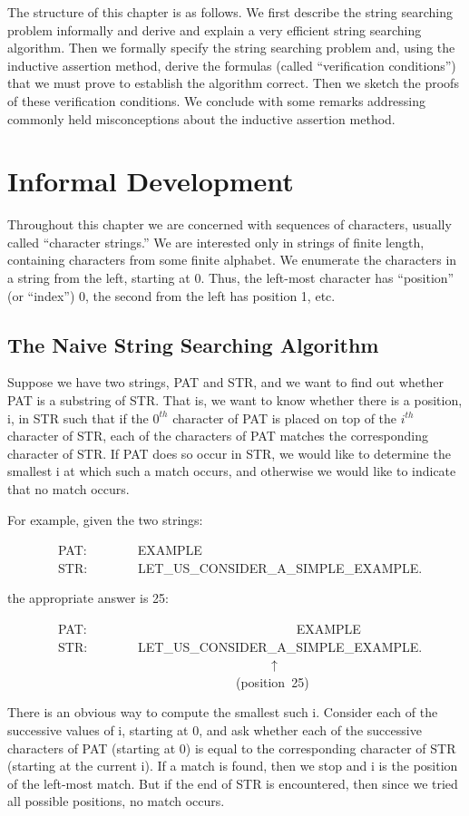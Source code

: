 \documentclass[10pt]{book}
\newenvironment{pubasis}{\begin{flushleft}}{\end{flushleft}}
\begin{document}
The structure of this chapter is as follows.
We first describe the string searching problem informally and
derive and explain a very efficient string searching algorithm.
Then we formally specify the string searching problem and, using the
inductive assertion method, derive the formulas (called ``verification
conditions'') that we must prove to establish the algorithm
correct.  Then we sketch the proofs of these verification
conditions.  We conclude with some remarks addressing commonly held
misconceptions about the inductive assertion method.

\section{Informal Development}
\label{SSFSTRPOSEXAMPLE}
Throughout this chapter we are concerned with sequences
of characters, usually called ``character strings.''  We are
interested only in strings of finite length, containing characters from some
finite alphabet.  We  enumerate the characters in a string from the
left, starting at 0.  Thus, the left-most character has ``position'' (or ``index'')
0, the second from the left has position 1, etc.

\subsection{The Naive String Searching Algorithm}
Suppose we have two strings, PAT and STR, and we want to find out
whether PAT is a substring of STR.  That is, we want to know whether
there is a position, i, in STR such that if the $0^{th}$ character of PAT
is placed on top of the $i^{th}$ character of STR, each of the
characters of PAT matches the corresponding character of STR.
If PAT does so occur in STR, we would like to determine the smallest
i at which such a match occurs, and otherwise we would like to indicate
that no match occurs.

For example, given the two strings:
\begin{pubasis}
~~~~~~~~PAT:~~~~~~~~EXAMPLE\\
~~~~~~~~STR:~~~~~~~~LET\_US\_CONSIDER\_A\_SIMPLE\_EXAMPLE.\\
\end{pubasis}
the appropriate answer is 25:
\begin{pubasis}
~~~~~~~~PAT:~~~~~~~~~~~~~~~~~~~~~~~~~~~~~~~~~EXAMPLE\\
~~~~~~~~STR:~~~~~~~~LET\_US\_CONSIDER\_A\_SIMPLE\_EXAMPLE.\\
~~~~~~~~~~~~~~~~~~~~~~~~~~~~~~~~~~~~~~~~~$\uparrow$\\
~~~~~~~~~~~~~~~~~~~~~~~~~~~~~~~~~~~~(position~25)\\
\end{pubasis}
There is an obvious way to compute the smallest such i.  Consider each
of the successive values of i, starting at 0, and ask whether
each of the successive characters of PAT (starting at 0) is equal
to the corresponding character of STR (starting at the current i).
If a match is found, then we stop and i is the position of the left-most match.
But if the end of STR is encountered, then
since we tried all possible positions, no match occurs.
\end{document}
